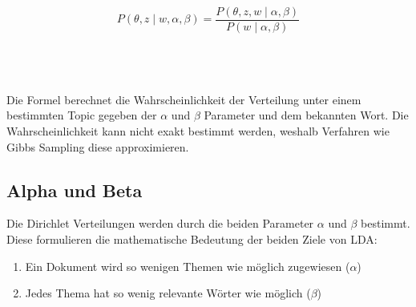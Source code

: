 \documentclass[german,version-2020-11]{uzl-thesis}
\begin{document}
\begin{center}
\begin{equation}
P(\theta, z \mid w, \alpha, \beta) = \frac{P(\theta, z, w \mid \alpha, \beta)}{P(w \mid \alpha, \beta)}
\end{equation}
\end{center}\\
\\
\\
Die Formel berechnet die Wahrscheinlichkeit der Verteilung unter einem bestimmten Topic gegeben der $\alpha$ und $\beta$ Parameter und dem bekannten Wort. Die Wahrscheinlichkeit kann nicht exakt bestimmt werden, weshalb Verfahren wie Gibbs Sampling diese approximieren.\\

\subsection{Alpha und Beta}
Die Dirichlet Verteilungen werden durch die beiden Parameter $\alpha$ und $\beta$ bestimmt. Diese formulieren die mathematische Bedeutung der beiden Ziele von LDA:

\begin{enumerate}
	\item Ein Dokument wird so wenigen Themen wie möglich zugewiesen ($\alpha$)
	\item Jedes Thema hat so wenig relevante Wörter wie möglich ($\beta$)
\end{enumerate}
\end{document}
